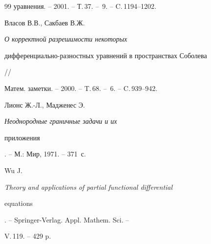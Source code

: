 \begin{thebibliography}{99}
уравнения. -- 2001. -- Т.\,37. -- \No\,9. -- C.\,1194--1202.




Власов В.В., Сакбаев В.Ж. {\em О корректной разрешимости некоторых


дифференциально-разностных уравнений в пространствах Соболева} //


Матем. заметки. -- 2000. -- T.\,68. -- \No\,6. -- C.\,939--942.




Лионс Ж.-Л., Мадженес Э. {\em Неоднородные граничные задачи и их


приложения}. -- М.: Мир, 1971. -- 371~с.




Wu J. {\em Theory and applications of partial functional differential


equations}. -- Springer-Verlag. Appl. Mathem. Sci. --


V.\,119. -- 429 p.





\end{thebibliography}





\vskip 2cm












\label{end}











